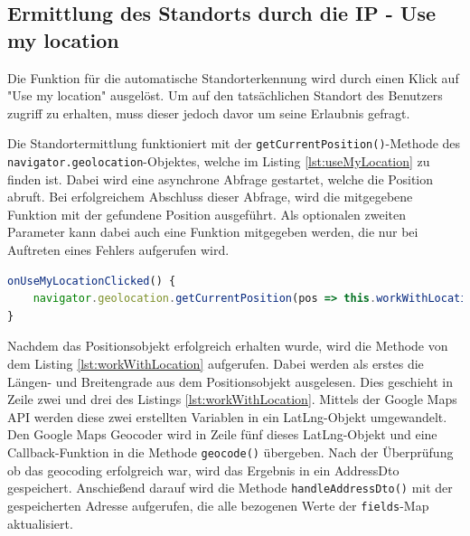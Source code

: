 \subsection{Ermittlung des Standorts durch die IP - Use my location}

Die Funktion für die automatische Standorterkennung wird durch einen Klick auf "Use my location" ausgelöst. Um auf den tatsächlichen Standort des Benutzers zugriff zu erhalten, muss dieser jedoch davor um seine Erlaubnis gefragt.\autocite{useMyLocation}

Die Standortermittlung funktioniert mit der \texttt{getCurrentPosition()}-Methode des \texttt{navigator.geolocation}-Objektes, welche im Listing \ref{lst:useMyLocation} zu finden ist. Dabei wird eine asynchrone Abfrage gestartet, welche die Position abruft. Bei erfolgreichem Abschluss dieser Abfrage, wird die mitgegebene Funktion mit der gefundene Position ausgeführt. Als optionalen zweiten Parameter kann dabei auch eine Funktion mitgegeben werden, die nur bei Auftreten eines Fehlers aufgerufen wird. \autocite{useMyLocation}

\begin{lstlisting}[caption={Die \texttt{onUseMyLocationClicked()}-Methode der \texttt{StreetComponent}-Klasse}, language=JavaScript,label={lst:useMyLocation}]
onUseMyLocationClicked() {
	navigator.geolocation.getCurrentPosition(pos => this.workWithLocation(pos, this));
}
\end{lstlisting}

Nachdem das Positionsobjekt erfolgreich erhalten wurde, wird die Methode von dem Listing \ref{lst:workWithLocation} aufgerufen. Dabei werden als erstes die Längen- und Breitengrade aus dem Positionsobjekt ausgelesen. Dies geschieht in Zeile zwei und drei des Listings \ref{lst:workWithLocation}. Mittels der Google Maps API werden diese zwei erstellten Variablen in ein LatLng-Objekt umgewandelt.\autocite{latLngObjekt} Den Google Maps Geocoder wird in Zeile fünf dieses LatLng-Objekt und eine Callback-Funktion in die Methode \texttt{geocode()} übergeben. Nach der Überprüfung ob das geocoding erfolgreich war, wird das Ergebnis in ein AddressDto gespeichert. Anschießend darauf wird die Methode \texttt{handleAddressDto()} mit der gespeicherten Adresse aufgerufen, die alle bezogenen Werte der \texttt{fields}-Map aktualisiert.

